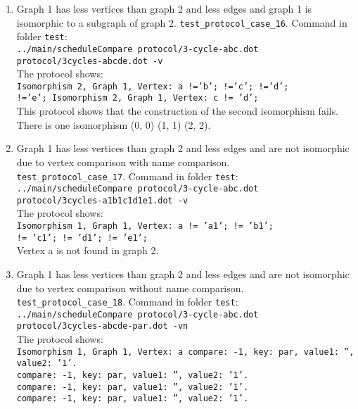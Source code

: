 \documentclass[12pt,a4paper]{report}
\begin{document}
\begin{enumerate}
  \item Graph 1 has less vertices than graph 2 and less edges and graph 1 is isomorphic to a subgraph of graph 2.
    \texttt{test\_protocol\_case\_16}. Command in folder \texttt{test}: \\
    \texttt{../main/scheduleCompare protocol/3-cycle-abc.dot \\ protocol/3cycles-abcde.dot -v} \\
    The protocol shows: \\
    \texttt{Isomorphism 2, Graph 1, Vertex: a !='b'; !='c'; !='d'; \\ !='e';
    Isomorphism 2, Graph 1, Vertex: c != 'd';} \\
    This protocol shows that the construction of the second isomorphism fails.
    There is one isomorphism (0, 0) (1, 1) (2, 2). 
  \item Graph 1 has less vertices than graph 2 and less edges and are not isomorphic due to vertex comparison with name comparison. \\
    \texttt{test\_protocol\_case\_17}. Command in folder \texttt{test}: \\
    \texttt{../main/scheduleCompare protocol/3-cycle-abc.dot \\ protocol/3cycles-a1b1c1d1e1.dot -v} \\
    The protocol shows: \\
    \texttt{Isomorphism 1, Graph 1, Vertex: a != 'a1'; != 'b1'; \\ != 'c1'; != 'd1'; != 'e1';} \\
    Vertex a is not found in graph 2.
  \item Graph 1 has less vertices than graph 2 and less edges and are not isomorphic due to vertex comparison without name comparison. \\
    \texttt{test\_protocol\_case\_18}. Command in folder \texttt{test}: \\
    \texttt{../main/scheduleCompare protocol/3-cycle-abc.dot \\ protocol/3cycles-abcde-par.dot -vn} \\
    The protocol shows: \\
    \texttt{Isomorphism 1, Graph 1, Vertex: a compare: -1, key: par, value1: '', value2: '1'. \\
    compare: -1, key: par, value1: '', value2: '1'. \\
    compare: -1, key: par, value1: '', value2: '1'. \\
    compare: -1, key: par, value1: '', value2: '1'. \\
}
\end{enumerate}
\end{document}
